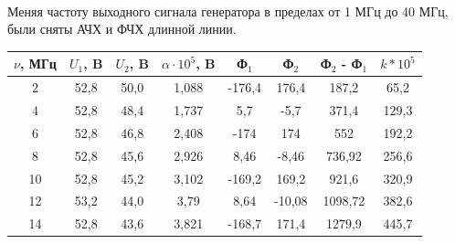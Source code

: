 \documentclass[a4paper,12pt]{article} %
\begin{document}
\paragraph{}
Меняя частоту выходного сигнала генератора в пределах от 1 МГц до 40 МГц, были сняты АЧХ и ФЧХ длинной линии.


\begin{table}[h]
	\centering
	\begin{tabular}{|c|c|c|c|c|c|c|c|}
	    \hline
		$\nu$, МГц& $U_1$, B& $U_2$, B & $\alpha \cdot 10^5 $, B&  Ф$_1$& Ф$_2$& Ф$_2$ - Ф$_1$ &$k*10^5$  \\ \hline
		2& 52,8 & 50,0 & 1,088 &-176,4 & 176,4 &187,2 &65,2\\ \hline
		4& 52,8 & 48,4 & 1,737&5,7 & -5,7 & 371,4& 129,3 \\ \hline
            6& 52,8 & 46,8 &2,408&-174 & 174 & 552&192,2 \\ \hline
            8& 52,8 & 45,6 & 2,926&8,46 & -8,46 & 736,92 & 256,6\\ \hline
            10& 52,8 & 45,2 & 3,102&-169,2 & 169,2 & 921,6 & 320,9  \\ \hline
            12& 53,2 & 44,0 & 3,79&8,64 & -10,08 & 1098,72 & 382,6  \\ \hline
            14& 52,8 & 43,6 & 3,821&-168,7 & 171,4&  1279,9 & 445,7  \\ \hline
             \end{tabular}
    \end{table}
\end{document}
